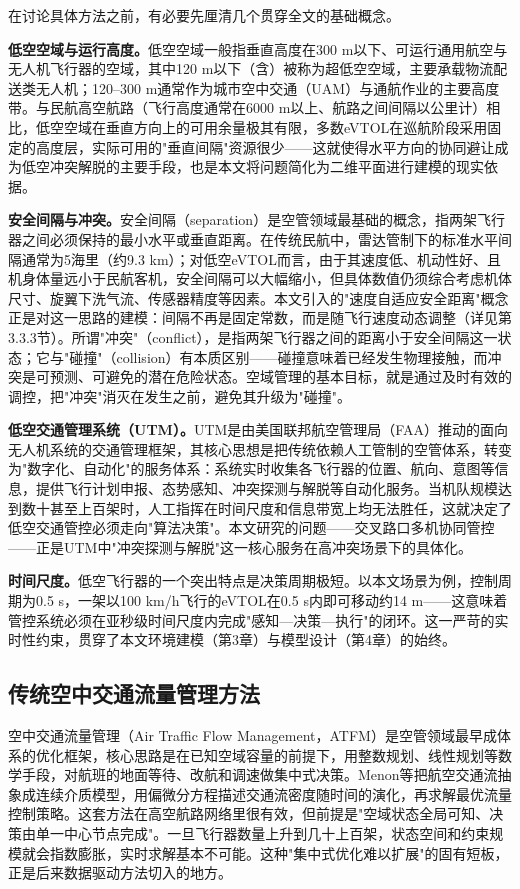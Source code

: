 \documentclass[12pt,a4paper,UTF8]{ctexart}
\begin{document}
在讨论具体方法之前，有必要先厘清几个贯穿全文的基础概念。

\textbf{低空空域与运行高度。}低空空域一般指垂直高度在300 m以下、可运行通用航空与无人机飞行器的空域，其中120 m以下（含）被称为超低空空域，主要承载物流配送类无人机；120--300 m通常作为城市空中交通（UAM）与通航作业的主要高度带。与民航高空航路（飞行高度通常在6000 m以上、航路之间间隔以公里计）相比，低空空域在垂直方向上的可用余量极其有限，多数eVTOL在巡航阶段采用固定的高度层，实际可用的"垂直间隔"资源很少——这就使得水平方向的协同避让成为低空冲突解脱的主要手段，也是本文将问题简化为二维平面进行建模的现实依据。

\textbf{安全间隔与冲突。}安全间隔（separation）是空管领域最基础的概念，指两架飞行器之间必须保持的最小水平或垂直距离。在传统民航中，雷达管制下的标准水平间隔通常为5海里（约9.3 km）；对低空eVTOL而言，由于其速度低、机动性好、且机身体量远小于民航客机，安全间隔可以大幅缩小，但具体数值仍须综合考虑机体尺寸、旋翼下洗气流、传感器精度等因素。本文引入的"速度自适应安全距离"概念正是对这一思路的建模：间隔不再是固定常数，而是随飞行速度动态调整（详见第3.3.3节）。所谓"冲突"（conflict），是指两架飞行器之间的距离小于安全间隔这一状态；它与"碰撞"（collision）有本质区别——碰撞意味着已经发生物理接触，而冲突是可预测、可避免的潜在危险状态。空域管理的基本目标，就是通过及时有效的调控，把"冲突"消灭在发生之前，避免其升级为"碰撞"。

\textbf{低空交通管理系统（UTM）。}UTM是由美国联邦航空管理局（FAA）推动的面向无人机系统的交通管理框架，其核心思想是把传统依赖人工管制的空管体系，转变为"数字化、自动化"的服务体系：系统实时收集各飞行器的位置、航向、意图等信息，提供飞行计划申报、态势感知、冲突探测与解脱等自动化服务。当机队规模达到数十甚至上百架时，人工指挥在时间尺度和信息带宽上均无法胜任，这就决定了低空交通管控必须走向"算法决策"。本文研究的问题——交叉路口多机协同管控——正是UTM中"冲突探测与解脱"这一核心服务在高冲突场景下的具体化。

\textbf{时间尺度。}低空飞行器的一个突出特点是决策周期极短。以本文场景为例，控制周期为0.5 s，一架以100 km/h飞行的eVTOL在0.5 s内即可移动约14 m——这意味着管控系统必须在亚秒级时间尺度内完成"感知—决策—执行"的闭环。这一严苛的实时性约束，贯穿了本文环境建模（第3章）与模型设计（第4章）的始终。

\subsection{传统空中交通流量管理方法}

空中交通流量管理（Air Traffic Flow Management，ATFM）是空管领域最早成体系的优化框架，核心思路是在已知空域容量的前提下，用整数规划、线性规划等数学手段，对航班的地面等待、改航和调速做集中式决策。Menon等\cite{ref2}把航空交通流抽象成连续介质模型，用偏微分方程描述交通流密度随时间的演化，再求解最优流量控制策略。这套方法在高空航路网络里很有效，但前提是"空域状态全局可知、决策由单一中心节点完成"。一旦飞行器数量上升到几十上百架，状态空间和约束规模就会指数膨胀，实时求解基本不可能。这种"集中式优化难以扩展"的固有短板，正是后来数据驱动方法切入的地方。
\end{document}
